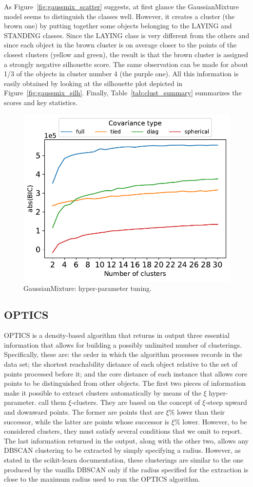 \documentclass[10pt, a4paper, twocolumn]{article}
\begin{document}
As Figure~\ref{fig:gaussmix_scatter} suggests, at first glance the GaussianMixture model seems to distinguish the classes well. However, it creates a cluster (the brown one) by putting together some objects belonging to the LAYING and STANDING classes. Since the LAYING class is very different from the others and since each object in the brown cluster is on average closer to the points of the closest clusters (yellow and green), the result is that the brown cluster is assigned a strongly negative silhouette score. The same observation can be made for about 1/3 of the objects in cluster number 4 (the purple one). All this information is easily obtained by looking at the silhouette plot depicted in Figure~\ref{fig:gaussmix_silh}. Finally, Table~\ref{tab:clust_summary} summarizes the scores and key statistics.

\begin{figure}[h]
    \centering
    \includegraphics[width=0.5\linewidth]{immagini simone/gausmix_cov.pdf}
    \caption{GaussianMixture: hyper-parameter tuning.}
    \label{fig:gausmix_tuning}
\end{figure}

\subsection*{OPTICS}

OPTICS is a density-based algorithm that returns in output three essential information that allows for building a possibly unlimited number of clusterings. Specifically, these are: the order in which the algorithm processes records in the data set; the shortest reachability distance of each object relative to the set of points processed before it; and the core distance of each instance that allows core points to be distinguished from other objects. The first two pieces of information make it possible to extract clusters automatically by means of the $\xi$ hyper-parameter. \textcite{optics:1999} call them $\xi$-clusters. They are based on the concept of $\xi$-steep upward and downward points. The former are points that are $\xi\%$ lower than their successor, while the latter are points whose successor is $\xi\%$ lower. However, to be considered clusters, they must satisfy several conditions that we omit to report. The last information returned in the output, along with the other two, allows any DBSCAN clustering to be extracted by simply specifying a radius. However, as stated in the scikit-learn documentation, these clusterings are similar to the one produced by the vanilla DBSCAN only if the radius specified for the extraction is close to the maximum radius used to run the OPTICS algorithm.
\end{document}
